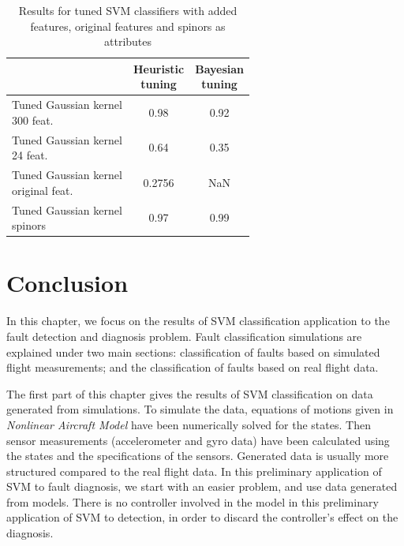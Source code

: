 \begin{table}[hbt!]
\caption{\label{tab:GaussianTuned} Results for tuned SVM classifiers with added features, original features and spinors as attributes}
\centering
\begin{tabular}{lcc}
\hline
& \makecell{ Heuristic\\ tuning} & \makecell{ Bayesian\\ tuning}\\\hline
 \makecell{Tuned Gaussian kernel \\ 300 feat.} & 0.98 & 0.92 \\
 \makecell{Tuned Gaussian kernel \\ 24 feat.} & 0.64 & 0.35 \\
 \makecell{Tuned Gaussian kernel \\ original feat.}  & 0.2756 & NaN\\
  \makecell{Tuned Gaussian kernel \\ spinors} & 0.97 & 0.99 \\
\hline
\end{tabular}
\end{table}

\section{Conclusion}

In this chapter, we focus on the results of SVM classification application to the fault detection and diagnosis problem. Fault classification simulations are explained under two main sections: classification of faults based on simulated flight measurements; and the classification of faults based on real flight data. 

The first part of this chapter gives the results of SVM classification on data generated from simulations. 
To simulate the data, equations of motions given in \emph{Nonlinear Aircraft Model} have been numerically solved for the states. 
Then sensor measurements (accelerometer and gyro data) have been calculated using the states and the specifications of the sensors. 
Generated data is usually more structured compared to the real flight data. 
In this preliminary application of SVM to fault diagnosis, we start with an easier problem, and use data generated from models.
There is no controller involved in the model in this preliminary application of SVM to detection, in order to discard the controller's effect on the diagnosis. 

